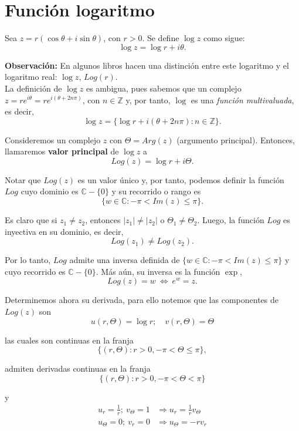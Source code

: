 \section{Función logaritmo}

\begin{defi}
Sea $z = r (\cos \theta + i \sin \theta)$, con $r > 0$. Se define $\log z$ como sigue:
$$\log z = \log r + i\theta.$$
\end{defi}

\textbf{Observación:} En algunos libros hacen una distinción entre este logaritmo y el logaritmo real: $\log z$, $Log(r)$.
\\

La definición de $\log z$ es ambigua, pues sabemos que un complejo $z = r e^{i\theta} = r e^{i(\theta + 2n\pi)}$, con $n \in \mathbb{Z}$ y, por tanto, $\log$ es una \textit{función multivaluada}, es decir, 
$$\log z = \{\log r + i(\theta + 2n\pi) : n \in \mathbb{Z}\}.$$

Consideremos un complejo $z$ con $\Theta = Arg(z)$ (argumento principal). Entonces, llamaremos \textbf{valor principal} de $\log z$ a
$$Log(z) = \log r + i\Theta.$$ 

Notar que $Log(z)$ es un valor único y, por tanto, podemos definir la función $Log$ cuyo dominio es $\mathbb{C} - \{0\}$ y su recorrido o rango es 
$$\{w \in \mathbb{C} : - \pi < Im(z) \leq \pi\}.$$

Es claro que si $z_1 \neq z_2$, entonces $|z_1| \neq |z_2|$ o $\Theta_1 \neq \Theta_2$. Luego, la función $Log$ es inyectiva en su dominio, es decir, 
$$Log(z_1) \neq Log(z_2).$$

Por lo tanto, $Log$ admite una inversa definida de $\{w \in \mathbb{C} : - \pi < Im(z) \leq \pi\}$ y cuyo recorrido es $\mathbb{C} - \{0\}$. Más aún, su inversa es la función $\exp$,
$$Log(z) = w ~\Leftrightarrow~ e^w = z.$$

Determinemos ahora su derivada, para ello notemos que las componentes de $Log(z)$ son
$$u(r,\Theta) = \log r; \quad v(r,\Theta) = \Theta$$

las cuales son continuas en la franja
$$\{(r,\Theta) : r > 0, -\pi < \Theta \leq \pi\},$$

admiten derivadas continuas en la franja
$$\{(r,\Theta) : r > 0, -\pi < \Theta < \pi\}$$

y
\begin{align*}
u_r = \frac{1}{r}; ~ v_{\Theta} = 1 &\Rightarrow u_r = \frac{1}{r} v_{\Theta} \\
u_{\Theta} = 0; ~ v_{r} = 0 &\Rightarrow u_{\Theta} = - rv_r 
\end{align*}

